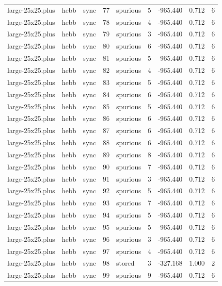 \begin{tabular}{lllrlrrrr}
large-25x25.plus & hebb & sync & 77 & spurious & 5 & -965.440 & 0.712 & 6 \\
large-25x25.plus & hebb & sync & 78 & spurious & 4 & -965.440 & 0.712 & 6 \\
large-25x25.plus & hebb & sync & 79 & spurious & 3 & -965.440 & 0.712 & 6 \\
large-25x25.plus & hebb & sync & 80 & spurious & 6 & -965.440 & 0.712 & 6 \\
large-25x25.plus & hebb & sync & 81 & spurious & 5 & -965.440 & 0.712 & 6 \\
large-25x25.plus & hebb & sync & 82 & spurious & 4 & -965.440 & 0.712 & 6 \\
large-25x25.plus & hebb & sync & 83 & spurious & 5 & -965.440 & 0.712 & 6 \\
large-25x25.plus & hebb & sync & 84 & spurious & 6 & -965.440 & 0.712 & 6 \\
large-25x25.plus & hebb & sync & 85 & spurious & 5 & -965.440 & 0.712 & 6 \\
large-25x25.plus & hebb & sync & 86 & spurious & 6 & -965.440 & 0.712 & 6 \\
large-25x25.plus & hebb & sync & 87 & spurious & 6 & -965.440 & 0.712 & 6 \\
large-25x25.plus & hebb & sync & 88 & spurious & 6 & -965.440 & 0.712 & 6 \\
large-25x25.plus & hebb & sync & 89 & spurious & 8 & -965.440 & 0.712 & 6 \\
large-25x25.plus & hebb & sync & 90 & spurious & 7 & -965.440 & 0.712 & 6 \\
large-25x25.plus & hebb & sync & 91 & spurious & 3 & -965.440 & 0.712 & 6 \\
large-25x25.plus & hebb & sync & 92 & spurious & 5 & -965.440 & 0.712 & 6 \\
large-25x25.plus & hebb & sync & 93 & spurious & 7 & -965.440 & 0.712 & 6 \\
large-25x25.plus & hebb & sync & 94 & spurious & 5 & -965.440 & 0.712 & 6 \\
large-25x25.plus & hebb & sync & 95 & spurious & 5 & -965.440 & 0.712 & 6 \\
large-25x25.plus & hebb & sync & 96 & spurious & 3 & -965.440 & 0.712 & 6 \\
large-25x25.plus & hebb & sync & 97 & spurious & 4 & -965.440 & 0.712 & 6 \\
large-25x25.plus & hebb & sync & 98 & stored & 3 & -327.168 & 1.000 & 2 \\
large-25x25.plus & hebb & sync & 99 & spurious & 9 & -965.440 & 0.712 & 6 \\

\end{tabular}
